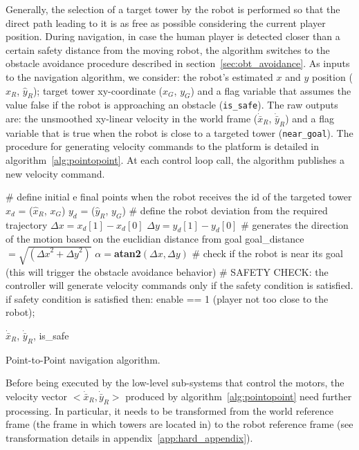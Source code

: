 Generally, the selection of a target tower by the robot is performed so that the direct path leading to it is as free as possible considering the current player position. 
During navigation, in case the human player is detected closer than a certain safety distance from the moving robot, the algorithm switches to the obstacle avoidance procedure described in section~\ref{sec:obt_avoidance}. As inputs to the navigation algorithm, we consider: the robot's estimated $x$ and $y$ position ($\hat{x}_R$, $\hat{y}_R$); target tower xy-coordinate ($x_G$, $y_G$) and a flag variable that assumes the value false if the robot is approaching an obstacle (\verb|is_safe|). The raw outputs are: the unsmoothed xy-linear velocity in the world frame ($\dot{\bar{x}}_R$, $\dot{\bar{y}}_R$) and a flag variable that is true when the robot is close to a targeted tower (\verb|near_goal|). The procedure for generating velocity commands to the platform is detailed in algorithm~\ref{alg:pointopoint}. At each control loop call, the algorithm publishes a new velocity command.

\begin{algorithm}[ht]
	\# define initial e final points when the robot receives the id of the targeted tower \;
	$x_d$ = ($\hat{x}_R$, $x_G$)\;
	$y_d$ = ($\hat{y}_R$, $y_G$)\;
	\# define the robot deviation from the required trajectory\;
	$\Delta x = x_d[1] - x_d[0]$\;
	$\Delta y = y_d[1] - y_d[0]$\;
	\# generates the direction of the motion based on the euclidian distance from goal\;
	goal\_distance$ = \sqrt{({\Delta x}^2 + {\Delta y}^2)}$\;
	$\alpha = $\textbf{atan2}$(\Delta x, \Delta y)$\;
	\# check if the robot is near its goal (this will trigger the obstacle avoidance behavior)\;
	\# SAFETY CHECK: the controller will generate velocity commands only if the safety condition is satisfied. if safety condition is satisfied then: enable == 1 (player not too close to the robot);\;
	
	\Return $\dot{\bar{x}}_R$, $\dot{\bar{y}}_R$, is\_safe 
	\caption{Point-to-Point navigation algorithm.}
	\label{alg:pointopoint}
\end{algorithm}

Before being executed by the low-level sub-systems that control the motors, the velocity vector $<\dot{\bar{x}}_R,\dot{\bar{y}}_R>$ produced by algorithm~\ref{alg:pointopoint} need further processing. In particular, it needs to be transformed from the world reference frame (the frame in which towers are located in) to the robot reference frame (see transformation details in appendix~\ref{app:hard_appendix}).

